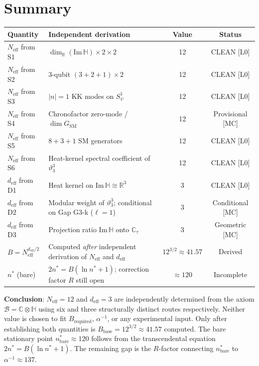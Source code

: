 \documentclass[12pt,a4paper]{article}
\theoremstyle{definition}
\theoremstyle{remark}
\begin{document}
\section{Summary}
\label{sec:summary}

\begin{center}
\renewcommand{\arraystretch}{1.4}
\begin{tabular}{p{3.5cm} p{6cm} c c}
\toprule
\textbf{Quantity} & \textbf{Independent derivation} & \textbf{Value} & \textbf{Status} \\
\midrule
$N_{\mathrm{eff}}$ from S1
  & $\dim_\mathbb{R}(\mathrm{Im}\,\mathbb{H})\times 2\times 2$
  & 12 & CLEAN [L0] \\
$N_{\mathrm{eff}}$ from S2
  & 3-qubit $(3{+}2{+}1)\times 2$
  & 12 & CLEAN [L0] \\
$N_{\mathrm{eff}}$ from S3
  & $|n|{=}1$ KK modes on $S^1_\psi$
  & 12 & CLEAN [L0] \\
$N_{\mathrm{eff}}$ from S4
  & Chronofactor zero-mode / $\dim G_{\mathrm{SM}}$
  & 12 & Provisional [MC] \\
$N_{\mathrm{eff}}$ from S5
  & $8{+}3{+}1$ SM generators
  & 12 & CLEAN [L0] \\
$N_{\mathrm{eff}}$ from S6
  & Heat-kernel spectral coefficient of $\vartheta_3^3$
  & 12 & CLEAN [L0] \\
\midrule
$d_{\mathrm{eff}}$ from D1
  & Heat kernel on Im$\,\mathbb{H}\cong\mathbb{R}^3$
  & 3 & CLEAN [L0] \\
$d_{\mathrm{eff}}$ from D2
  & Modular weight of $\vartheta_3^3$; conditional on Gap G3-k ($\ell{=}1$)
  & 3 & Conditional [MC] \\
$d_{\mathrm{eff}}$ from D3
  & Projection ratio Im$\,\mathbb{H}$ onto $\mathbb{C}_\tau$
  & 3 & Geometric [MC] \\
\midrule
$B = N_{\mathrm{eff}}^{d_{\mathrm{eff}}/2}$
  & Computed \emph{after} independent derivation of $N_{\mathrm{eff}}$ and $d_{\mathrm{eff}}$
  & $12^{3/2}\!\approx\!41.57$ & Derived \\
\midrule
$n^*$ (bare)
  & $2n^* = B(\ln n^*\!+\!1)$; correction factor $R$ still open
  & $\approx 120$ & Incomplete \\
\bottomrule
\end{tabular}
\end{center}

\bigskip
\textbf{Conclusion}:
$N_{\mathrm{eff}} = 12$ and $d_{\mathrm{eff}} = 3$ are independently determined
from the axiom $\mathcal{B} = \mathbb{C}\otimes\mathbb{H}$ using six and three
structurally distinct routes respectively.  Neither value is chosen to fit
$B_{\mathrm{required}}$, $\alpha^{-1}$, or any experimental input.
Only after establishing both quantities is $B_{\mathrm{base}} = 12^{3/2} \approx 41.57$
computed.  The bare stationary point $n^*_{\mathrm{bare}} \approx 120$ follows
from the transcendental equation $2n^* = B(\ln n^*+1)$.  The remaining gap is
the $R$-factor connecting $n^*_{\mathrm{bare}}$ to $\alpha^{-1} \approx 137$.

\ifdefined\INCLUDEMODE
\else
\end{document}

